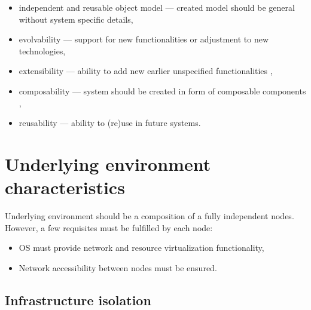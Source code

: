 \documentclass[11pt,openany]{book}
\begin{document}
      \begin{itemize}
        \item independent and reusable object model --- created model should be general without system specific details,
        \item evolvability --- support for new functionalities or adjustment to new technologies,
        \item extensibility --- ability to add new earlier unspecified functionalities ,
        \item composability --- system should be created in form of composable components ,
        \item reusability --- ability to (re)use in future systems.
      \end{itemize}



    \section{Underlying environment characteristics}
    \label{sec:req:env}

      Underlying environment should be a composition of a fully independent nodes. However, a few requisites must be
      fulfilled by each node:

      \begin{itemize}
        \item OS must provide network and resource virtualization functionality,
        \item Network accessibility between nodes must be ensured.
      \end{itemize}


	

      \subsection{Infrastructure isolation}
      \label{sec:req:iso}
\end{document}
